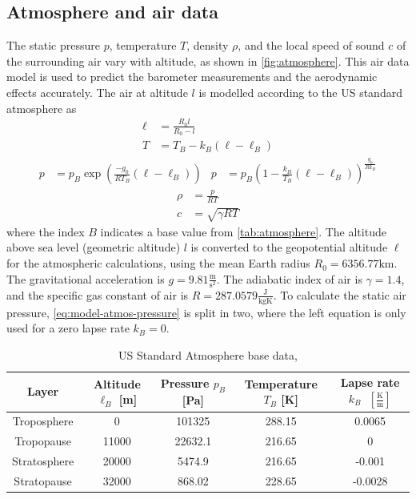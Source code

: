 \subsection{Atmosphere and air data}
\label{sec:model-atmosphere}
The static pressure $p$, temperature $T$, density $\rho$, and the local speed of sound $c$ of the surrounding air vary with altitude, as shown in \autoref{fig:atmosphere}.
This air data model is used to predict the barometer measurements and the aerodynamic effects accurately.
The air at altitude $l$ is modelled according to the US standard atmosphere \cite{usstandardatmosphere1976, stengel2004} as
\begin{align}
    \ell &= \frac{ R_0 l }{ R_0 - l } \label{eq:model-atmos-geopot} \\
    T &= T_B - k_B (\ell-\ell_B) \label{eq:model-atmos-temperature}
\end{align}
\begin{align}
    p &= p_B \exp \left( \frac{-g_0}{R T_B} (\ell-\ell_B) \right) &
    p &= p_B \left( 1 - \frac{k_B}{T_B} (\ell-\ell_B) \right) ^\frac{g_0}{R k_B} \label{eq:model-atmos-pressure}
\end{align}
\begin{align}
    \rho &= \frac{p}{R T} \label{eq:model-atmos-density} \\
    c &= \sqrt{\gamma R T} \label{eq:model-atmos-mach}
\end{align}
where the index $B$ indicates a base value from \autoref{tab:atmosphere}. 
The altitude above sea level (geometric altitude) $l$ is converted to the geopotential altitude $\ell$ for the atmospheric calculations, using the mean Earth radius $R_0 = 6356.77 \mathrm{km}$. The gravitational acceleration is $g = 9.81 \frac{\mathrm{m}}{\mathrm{s}^2}$.
The adiabatic index of air is $\gamma = 1.4$, and the specific gas constant of air is $R = 287.0579 \frac{\mathrm{J}}{\mathrm{kg K}}$.
To calculate the static air pressure, \autoref{eq:model-atmos-pressure} is split in two, where the left equation is only used for a zero lapse rate $k_B = 0$.
\begin{table}[ht]
\begin{center}
\begin{tabular}{c c c c c}
Layer & Altitude $\ell_B$ [m] & Pressure $p_B$ [Pa] & Temperature $T_B$ [K] & Lapse rate $k_B \text{ } [\frac{\mathrm{K}}{\mathrm{m}}]$  \\
\hline %
Troposphere & 0 & 101325 & 288.15 & 0.0065 \\
Tropopause & 11000 & 22632.1 & 216.65 & 0 \\
Stratosphere & 20000 & 5474.9 & 216.65 & -0.001 \\ 
Stratopause & 32000 & 868.02 & 228.65 & -0.0028 \\
\end{tabular}
\end{center}
\caption[Atmosphere base data]{US Standard Atmosphere base data, \cite{usstandardatmosphere1976}} \label{tab:atmosphere}
\end{table}

